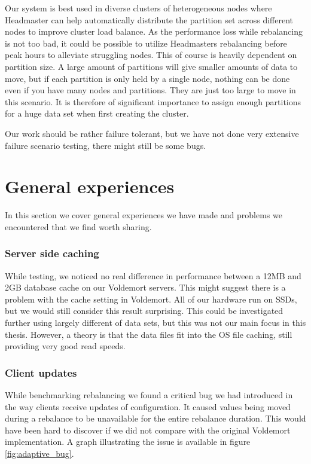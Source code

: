 Our system is best used in diverse clusters of heterogeneous nodes where Headmaster can help automatically distribute the partition set across different nodes to improve cluster load balance. As the performance loss while rebalancing is not too bad, it could be possible to utilize Headmasters rebalancing before peak hours to alleviate struggling nodes. This of course is heavily dependent on partition size. A large amount of partitions will give smaller amounts of data to move, but if each partition is only held by a single node, nothing can be done even if you have many nodes and partitions. They are just too large to move in this scenario. It is therefore of significant importance to assign enough partitions for a huge data set when first creating the cluster.

Our work should be rather failure tolerant, but we have not done very extensive failure scenario testing, there might still be some bugs. 

\section{General experiences}
\label{eval:exp}
In this section we cover general experiences we have made and problems we encountered that we find worth sharing. 

\subsubsection{Server side caching}
While testing, we noticed no real difference in performance between a 12MB and 2GB database cache on our Voldemort servers. This might suggest there is a problem with the cache setting in Voldemort. All of our hardware run on SSDs, but we would still consider this result surprising. This could be investigated further using largely different of data sets, but this was not our main focus in this thesis. However, a theory is that the data files fit into the OS file caching, still providing very good read speeds.

\subsubsection{Client updates}
While benchmarking rebalancing we found a critical bug we had introduced in the way clients receive updates of configuration. It caused values being moved during a rebalance to be unavailable for the entire rebalance duration. This would have been hard to discover if we did not compare with the original Voldemort implementation. A graph illustrating the issue is available in figure \ref{fig:adaptive_bug}.

